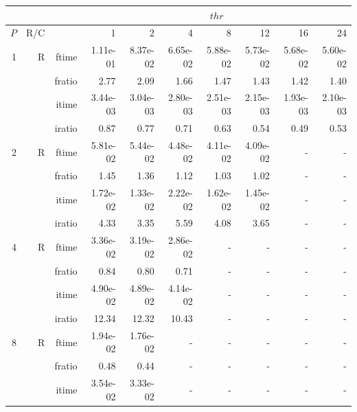\documentclass[a4paper]{article}
\begin{document}
\begin{table}[htbp]
\begin{center}
\begin{small}
\begin{tabular}{|r|r|r|r|r|r|r|r|r|r|}
\hline 
     & & & \multicolumn{7}{c|}{$thr$} \\ \hline
    $P$ & R/C &  & 1           & 2    & 4    & 8    & 12   & 16    & 24  \\ \hline\hline
     1 & R & ftime & 1.11e-01 & 8.37e-02 & 6.65e-02 & 5.88e-02 & 5.73e-02 & 5.68e-02 & 5.60e-02 \\   
          &      & fratio & 2.77 & 2.09 & 1.66 & 1.47 & 1.43 & 1.42 & 1.40 \\   
          &      & itime & 3.44e-03 & 3.04e-03 & 2.80e-03 & 2.51e-03 & 2.15e-03 & 1.93e-03 & 2.10e-03 \\   
          &      & iratio & 0.87 & 0.77 & 0.71 & 0.63 & 0.54 & 0.49 & 0.53 \\ \hline 
     2 & R & ftime & 5.81e-02 & 5.44e-02 & 4.48e-02 & 4.11e-02 & 4.09e-02 &     -     &     -     \\   
          &      & fratio & 1.45 & 1.36 & 1.12 & 1.03 & 1.02 &     -     &     -     \\   
          &      & itime & 1.72e-02 & 1.33e-02 & 2.22e-02 & 1.62e-02 & 1.45e-02 &     -     &     -     \\   
          &      & iratio & 4.33 & 3.35 & 5.59 & 4.08 & 3.65 &     -     &     -     \\ \hline 
     4 & R & ftime & 3.36e-02 & 3.19e-02 & 2.86e-02 &     -     &     -     &     -     &     -     \\   
          &      & fratio & 0.84 & 0.80 & 0.71 &     -     &     -     &     -     &     -     \\   
          &      & itime & 4.90e-02 & 4.89e-02 & 4.14e-02 &     -     &     -     &     -     &     -     \\   
          &      & iratio & 12.34 & 12.32 & 10.43 &     -     &     -     &     -     &     -     \\ \hline 
     8 & R & ftime & 1.94e-02 & 1.76e-02 &     -     &     -     &     -     &     -     &     -     \\   
          &      & fratio & 0.48 & 0.44 &     -     &     -     &     -     &     -     &     -     \\   
          &      & itime & 3.54e-02 & 3.33e-02 &     -     &     -     &     -     &     -     &     -     \\   

\end{tabular}
\end{small}
\end{center}
\end{table}
\end{document}
